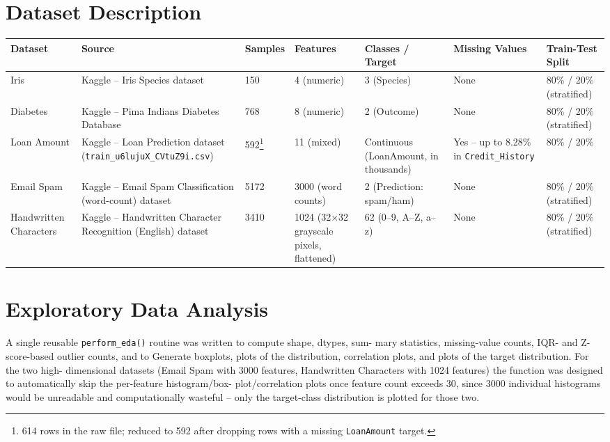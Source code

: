 \documentclass[12pt,a4paper]{article}
\begin{document}
\section{Dataset Description}
\begingroup
\small
\begin{longtable}{|p{2.6cm}|p{2.6cm}|p{1.3cm}|p{1.3cm}|p{1.9cm}|p{1.7cm}|p{1.7cm}|}
\hline
\textbf{Dataset} & \textbf{Source} & \textbf{Samples} & \textbf{Features} & \textbf{Classes / Target} & \textbf{Missing Values} & \textbf{Train-Test Split} \\
\hline
\endhead
Iris & Kaggle -- Iris Species dataset & 150 & 4 (numeric) & 3 (Species) & None & 80\% / 20\% (stratified) \\
\hline
Diabetes & Kaggle -- Pima Indians Diabetes Database & 768 & 8 (numeric) & 2 (Outcome) & None & 80\% / 20\% (stratified) \\
\hline
Loan Amount & Kaggle -- Loan Prediction dataset (\texttt{train\_u6lujuX\_CVtuZ9i.csv}) & 592\footnote{614 rows in the raw file; reduced to 592 after dropping rows with a missing \texttt{LoanAmount} target.} & 11 (mixed) & Continuous (LoanAmount, in thousands) & Yes -- up to 8.28\% in \texttt{Credit\_History} & 80\% / 20\% \\
\hline
Email Spam & Kaggle -- Email Spam Classification (word-count) dataset & 5172 & 3000 (word counts) & 2 (Prediction: spam/ham) & None & 80\% / 20\% (stratified) \\
\hline
Handwritten Characters & Kaggle -- Handwritten Character Recognition (English) dataset & 3410 & 1024 (32$\times$32 grayscale pixels, flattened) & 62 (0--9, A--Z, a--z) & None & 80\% / 20\% (stratified) \\
\hline
\end{longtable}
\endgroup
 
\section{Exploratory Data Analysis}
A single reusable \texttt{perform\_eda()} routine was written to compute shape, dtypes, sum-
mary statistics, missing-value counts, IQR- and Z-score-based outlier counts, and to
Generate boxplots, plots of the distribution, correlation plots, and plots of the target distribution. For the two high-
dimensional datasets (Email Spam with 3000 features, Handwritten Characters with 1024
features) the function was designed to automatically skip the per-feature histogram/box-
plot/correlation plots once feature count exceeds 30, since 3000 individual histograms
would be unreadable and computationally wasteful – only the target-class distribution is
plotted for those two.
 
\end{document}
